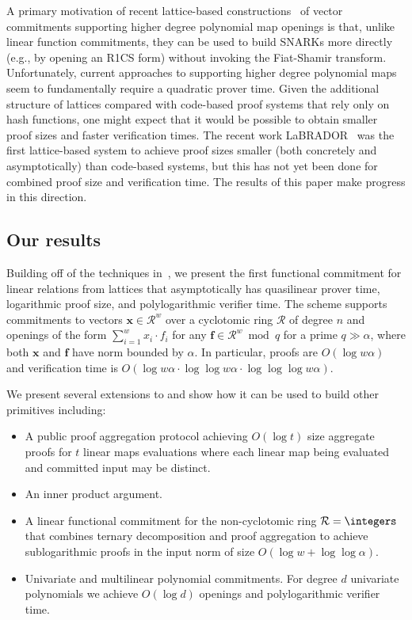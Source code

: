 A primary motivation of recent lattice-based constructions~\cite{C:ACLMT22,WW22} of vector commitments supporting higher degree polynomial map openings is that, unlike linear function commitments, they can be used to build SNARKs more directly (e.g., by opening an R1CS form) without invoking the Fiat-Shamir transform. Unfortunately, current approaches to supporting higher degree polynomial maps seem to fundamentally require a quadratic prover time. Given the additional structure of lattices compared with code-based proof systems that rely only on hash functions, one might expect that it would be possible to obtain smaller proof sizes and faster verification times. The recent work LaBRADOR~\cite{BS22} was the first lattice-based system to achieve proof sizes smaller (both concretely and asymptotically) than code-based systems, but this has not yet been done for combined proof size and verification time. The results of this paper make progress in this direction. 


\subsection{Our results}
\label{sec:results}

Building off of the techniques in~\cite{C:ACLMT22}, we present the first functional commitment for linear relations from lattices that asymptotically has quasilinear prover time, logarithmic proof size, and polylogarithmic verifier time. The scheme supports commitments to vectors $\mathbf{x} \in \mathcal{R}^w$ over a cyclotomic ring $\mathcal{R}$ of degree $n$ and openings of the form $\sum_{i = 1}^w x_i \cdot f_i$ for any $\mathbf{f} \in \mathcal{R}^w \bmod q$ for a prime $q  \gg \alpha$, where both $\mathbf{x}$ and $\mathbf{f}$ have norm bounded by $\alpha$. In particular, proofs are $O(\log w\alpha)$ and verification time is $O(\log w\alpha \cdot \log \log w\alpha \cdot \log \log \log w\alpha)$.

We present several extensions to \sys and show how it can be used to build other primitives including:
\begin{itemize}[noitemsep]
        \item A public proof aggregation protocol achieving $O(\log t)$ size aggregate proofs for $t$ linear maps evaluations where each linear map being evaluated and committed input may be distinct.
        \item An inner product argument.
        \item A linear functional commitment for the non-cyclotomic ring $\mathcal{R} = \integers$ that combines ternary decomposition and proof aggregation to achieve sublogarithmic proofs in the input norm of size $O(\log w + \log \log \alpha)$.
        \item Univariate and multilinear polynomial commitments. For degree $d$ univariate polynomials we achieve $O(\log d)$ openings and polylogarithmic verifier time.
\end{itemize}


